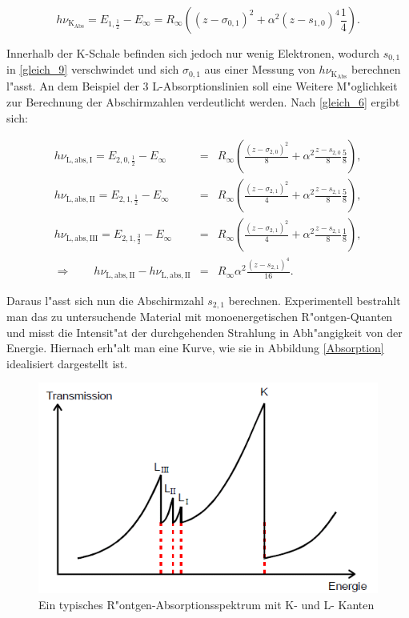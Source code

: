 		\begin{equation}
			h\nu_{\mathrm{K}_\mathrm{Abs}} = E_{1,\frac{1}{2}} - E_\infty = R_\infty \left( (z - \sigma_{0,1})^2 + \alpha^2 (z-s_{1,0})^4 \frac{1}{4} \right). \label{gleich_11}
		\end{equation}

		Innerhalb der K-Schale befinden sich jedoch nur wenig Elektronen, wodurch $s_{0,1}$ in \eqref{gleich_9} verschwindet und sich $\sigma_{0,1}$ aus einer Messung von $h\nu_{\mathrm{K}_\mathrm{Abs}}$ berechnen l"asst.
		An dem Beispiel der 3 L-Absorptionslinien soll eine Weitere M"oglichkeit zur Berechnung der Abschirmzahlen verdeutlicht werden.
		Nach \eqref{gleich_6} ergibt sich:

		\begin{eqnarray*}
			h \nu_\mathrm{L,abs,I} = E_{2,0,\frac{1}{2}} - E_\infty &=& R_\infty \left( \frac{(z-\sigma_{2,0})^2}{8} + \alpha^2 \frac{z - s_{2,0}}{8} \frac{5}{8} \right),\\
			h \nu_\mathrm{L,abs,II} = E_{2,1,\frac{1}{2}} - E_\infty &=& R_\infty \left( \frac{(z-\sigma_{2,1})^2}{4} + \alpha^2 \frac{z - s_{2,1}}{8} \frac{5}{8} \right),\\
			h \nu_\mathrm{L,abs,III} = E_{2,1,\frac{3}{2}} - E_\infty &=& R_\infty \left( \frac{(z-\sigma_{2,1})^2}{4} + \alpha^2 \frac{z - s_{2,1}}{8} \frac{1}{8} \right),\\
			\Rightarrow \qquad h\nu_\mathrm{L,abs,II} - h\nu_\mathrm{L,abs,II} &=& R_\infty \alpha^2 \frac{(z - s_{2,1})^4}{16}.
		\end{eqnarray*}

		Daraus l"asst sich nun die Abschirmzahl $s_{2,1}$ berechnen.
		Experimentell bestrahlt man das zu untersuchende Material mit monoenergetischen R"ontgen-Quanten und misst die Intensit"at der durchgehenden Strahlung in Abh"angigkeit von der Energie.
		Hiernach erh"alt man eine Kurve, wie sie in Abbildung \eqref{Absorption} idealisiert dargestellt ist.

		\begin{figure}[htbp]
			\centering
			\includegraphics[width = 12cm]{img/absorption.png}
			\caption{Ein typisches R"ontgen-Absorptionsspektrum mit K- und L- Kanten}
			\label{Absorption}
		\end{figure}

